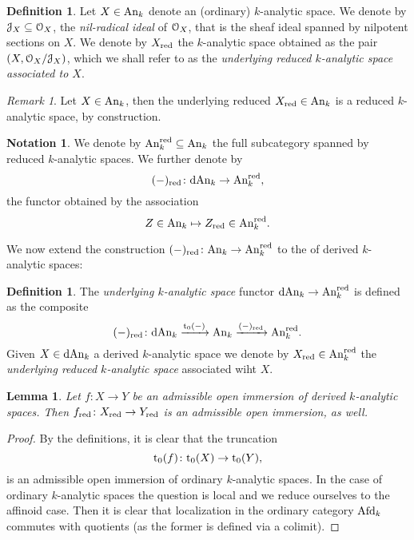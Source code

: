 \documentclass[10pt,a4paper,reqno]{amsart} %
\theoremstyle{plain}
\newtheorem{lem}[thm]{Lemma}
\theoremstyle{definition}
\newtheorem{defin}[thm]{Definition}
\newtheorem{notation}[thm]{Notation}
\theoremstyle{remark}
\newtheorem{rem}[thm]{Remark}
\numberwithin{equation}{section}
\begin{document}
\begin{defin} Let $X \in \mathrm{An}_k$ denote an (ordinary) $k$-analytic space.
    We denote by $\mathcal J_X \subseteq \mathcal O_X$, the \emph{nil-radical ideal} of $\mathcal O_X$, that is the sheaf ideal spanned by nilpotent
    sections on $X$. We denote by $X_{\mathrm{red}}$ the $k$-analytic space obtained as the pair $(X, \mathcal O_{X}/ \mathcal J_X)$, which we shall refer to as the \emph{underlying reduced $k$-analytic space
    associated to $X$}.       
\end{defin}

\begin{rem}
    Let $X \in \mathrm{An}_k$, then the underlying reduced $X_{\mathrm{red}} \in \mathrm{An}_k$ is a reduced $k$-analytic space, by construction.
\end{rem}

\begin{notation}
    We denote by $\mathrm{An}_k^\mathrm{red} \subseteq \mathrm{An}_k$ the full subcategory spanned by reduced $k$-analytic spaces. We further denote by
    \[(-)_{\mathrm{red}} \colon \mathrm{dAn}_k \to \mathrm{An}_k^{\mathrm{red}},\]
    the functor obtained by the association
        \[
            Z \in \mathrm{An}_k \mapsto Z_{\mathrm{red}} \in \mathrm{An}_k^\mathrm{red}.
        \]
\end{notation}

We now extend the construction $(-)_{\mathrm{red}} \colon \mathrm{An}_k \to \mathrm{An}_k^\mathrm{red}$ to the \infcat of derived $k$-analytic spaces:

\begin{defin}
    The \emph{underlying $k$-analytic space} functor $\mathrm{dAn}_k \to \mathrm{An}_k^\mathrm{red}$ is defined as the composite
        \[
            (-)_{\mathrm{red}} \colon \mathrm{dAn}_k \xrightarrow{\mathrm{t}_0(-)} \mathrm{An}_k \xrightarrow{(-)_{\mathrm{red}}} \mathrm{An}_k^\mathrm{red}.
        \]
    Given $X \in \mathrm{dAn}_k$ a derived $k$-analytic space we denote by $X_{\mathrm{red}} \in \mathrm{An}_k^{\mathrm{red}}$ the \emph{underlying reduced $k$-analytic space}
    associated wiht $X$. 
\end{defin}

\begin{lem}
    Let $f \colon X \to Y$ be an admissible open immersion of derived $k$-analytic spaces. Then $f_{\mathrm{red}} \colon X_{\mathrm{red}} \to Y_{\mathrm{red}}$ is
    an admissible open immersion, as well.
\end{lem}

\begin{proof}
    By the definitions, it is clear that the truncation
        \[
            \mathrm{t}_0(f) \colon \mathrm{t}_0(X) \to \mathrm{t}_0(Y),  
        \]
    is an admissible open immersion of ordinary $k$-analytic spaces. In the case of ordinary $k$-analytic spaces the question is local and we reduce ourselves to the affinoid case.
    Then it is clear that localization in the ordinary category $\mathrm{Afd}_k$ commutes with quotients (as the former is defined via a colimit).
\end{proof}
\end{document}
